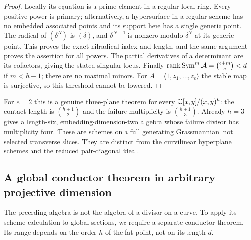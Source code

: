\begin{proof}
Locally its equation is a prime element in a regular local ring.
Every positive power is primary; alternatively, a hypersurface in
a regular scheme has no embedded associated points and its support
here has a single generic point. The radical of $(\delta^N)$ is
$(\delta)$, and $\delta^{N-1}$ is nonzero modulo $\delta^N$ at its
generic point. This proves the exact nilradical index and length,
and the same argument proves the assertion for all powers.
The partial derivatives of a determinant are its cofactors, giving
the stated singular locus.
Finally $\operatorname{rank}\operatorname{Sym}^m\mathcal A=\binom{e+m}{e}<d$ if $m<h-1$;
there are no maximal minors. For $A=\langle1,z_1,\ldots,z_e\rangle$
the stable map is surjective, so this threshold cannot be lowered.
\end{proof}

For $e=2$ this is a genuine three-plane theorem for every
$\mathbb C[x,y]/(x,y)^h$: the contact length is $\binom{h+1}{2}$ and the
failure multiplicity is $\binom{h+1}{3}$. Already $h=3$ gives a
length-six, embedding-dimension-two algebra whose failure divisor
has multiplicity four. These are schemes on a full generating
Grassmannian, not selected transverse slices. They are distinct from
the curvilinear hyperplane schemes and the reduced pair-diagonal ideal.

\subsection{A global conductor theorem in arbitrary projective dimension}
The preceding algebra is not the algebra of a divisor on a curve.
To apply its scheme calculation to global sections, we require a
separate conductor theorem. Its range depends on the order $h$ of
the fat point, not on its length $d$.

